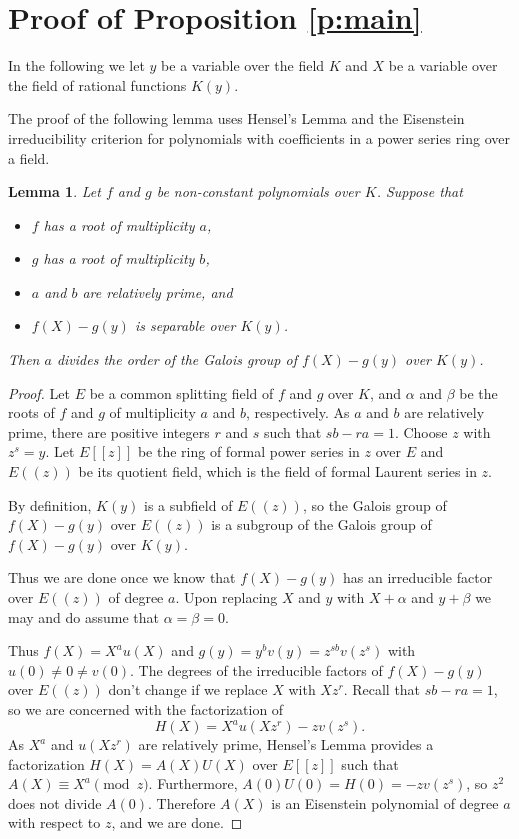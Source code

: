 \documentclass[12pt]{article}
\theoremstyle{plain}
\newtheorem{lemma}[theorem]{Lemma}
\theoremstyle{definition}
\begin{document}
\section{Proof of Proposition \ref{p:main}}
In the following we let $y$ be a variable over the field $K$ and $X$
be a variable over the field of rational functions $K(y)$.

The proof of the following lemma uses Hensel's Lemma and the
Eisenstein irreducibility criterion for polynomials with coefficients
in a power series ring over a field.
\begin{lemma}\label{l:main}
  Let $f$ and $g$ be non-constant polynomials over $K$. Suppose that
  \begin{itemize}
  \item[(i)] $f$ has a root of multiplicity $a$,
  \item[(ii)] $g$ has a root of multiplicity $b$,
  \item[(iii)] $a$ and $b$ are relatively prime, and
  \item[(iv)] $f(X)-g(y)$ is separable over $K(y)$.
  \end{itemize}
  Then $a$ divides the order of the Galois group of $f(X)-g(y)$ over
  $K(y)$.
\end{lemma}
\begin{proof}
  Let $E$ be a common splitting field of $f$ and $g$ over $K$, and
  $\alpha$ and $\beta$ be the roots of $f$ and $g$ of multiplicity $a$
  and $b$, respectively. As $a$ and $b$ are relatively prime, there
  are positive integers $r$ and $s$ such that $sb-ra=1$. Choose $z$
  with $z^s=y$. Let $E[[z]]$ be the ring of formal power series in $z$
  over $E$ and $E((z))$ be its quotient field, which is the field of
  formal Laurent series in $z$.

  By definition, $K(y)$ is a subfield of $E((z))$, so the Galois group
  of $f(X)-g(y)$ over $E((z))$ is a subgroup of the Galois group of
  $f(X)-g(y)$ over $K(y)$.

  Thus we are done once we know that $f(X)-g(y)$ has an irreducible
  factor over $E((z))$ of degree $a$. Upon replacing $X$ and $y$ with
  $X+\alpha$ and $y+\beta$ we may and do assume that $\alpha=\beta=0$.

  Thus $f(X)=X^au(X)$ and $g(y)=y^bv(y)=z^{sb}v(z^s)$ with
  $u(0)\ne0\ne v(0)$. The degrees of the irreducible factors of
  $f(X)-g(y)$ over $E((z))$ don't change if we replace $X$ with
  $Xz^r$. Recall that $sb-ra=1$, so we are concerned with the
  factorization of\[ H(X)=X^au(Xz^r)-zv(z^s).
  \]
  As $X^a$ and $u(Xz^r)$ are relatively prime, Hensel's Lemma provides
  a factorization $H(X)=A(X)U(X)$ over $E[[z]]$ such that
  $A(X)\equiv X^a\pmod{z}$. %
  Furthermore, $A(0)U(0)=H(0)=-zv(z^s)$, so $z^2$ does not divide
  $A(0)$. Therefore $A(X)$ is an Eisenstein polynomial of degree $a$
  with respect to $z$, and we are done.
\end{proof}
\end{document}
